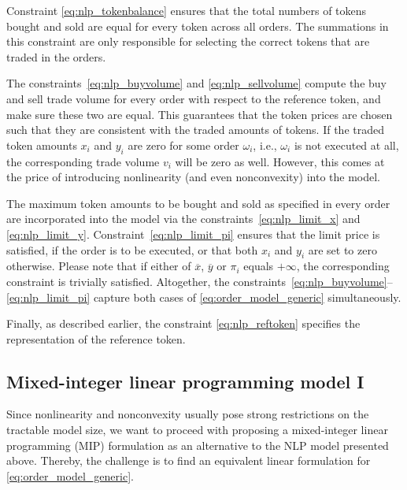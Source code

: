 \documentclass[11pt,parskip=full]{scrartcl}%
\newcommand*{\ie}{i.e., }
\newcommand*{\wrt}{with respect to }
\begin{document}
Constraint \eqref{eq:nlp_tokenbalance} ensures that the total numbers of tokens bought and sold are
equal for every token across all orders.
The summations in this constraint are only responsible for selecting the correct tokens that are
traded in the orders.

The constraints~\eqref{eq:nlp_buyvolume} and \eqref{eq:nlp_sellvolume} compute the buy and sell
trade volume for every order \wrt the reference token, and make sure these two are equal.
This guarantees that the token prices are chosen such that they are consistent with the traded
amounts of tokens.
If the traded token amounts $ x_i $ and $ y_i $ are zero for some order $ \omega_i $, \ie
$ \omega_i $ is not executed at all, the corresponding trade volume $ v_i $ will be zero as well.
However, this comes at the price of introducing nonlinearity (and even nonconvexity) into the
model.

The maximum token amounts to be bought and sold as specified in every order are incorporated
into the model via the constraints~\eqref{eq:nlp_limit_x} and \eqref{eq:nlp_limit_y}.
Constraint~\eqref{eq:nlp_limit_pi} ensures that the limit price is satisfied, if the order is
to be executed, or that both $ x_i $ and $ y_i $ are set to zero otherwise.
Please note that if either of $\overline{x}$, $\overline{y}$ or $\pi_i$ equals $+\infty$, the
corresponding constraint is trivially satisfied.
Altogether, the constraints~\eqref{eq:nlp_buyvolume}--\eqref{eq:nlp_limit_pi} capture both
cases of \eqref{eq:order_model_generic} simultaneously.

Finally, as described earlier, the constraint \eqref{eq:nlp_reftoken} specifies the representation of the reference token.


\newpage
\subsection{Mixed-integer linear programming model I}
\label{subsec:MIP1}

Since nonlinearity and nonconvexity usually pose strong restrictions on the tractable model size,
we want to proceed with proposing a mixed-integer linear programming (MIP) formulation as an
alternative to the NLP model presented above.
Thereby, the challenge is to find an equivalent linear formulation for 
\eqref{eq:order_model_generic}.
\end{document}

